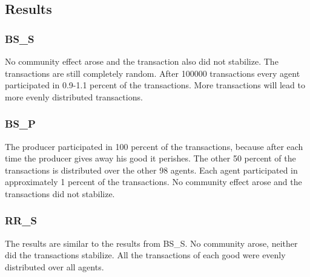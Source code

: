 \documentclass[twoside,openright]{uva-bachelor-thesis}
\begin{document}
\subsection{Results}

\subsubsection{BS\_S}
No community effect arose and the transaction also did not stabilize. The transactions are still completely random. After 100000 transactions every agent participated in 0.9-1.1 percent of the transactions. More transactions will lead to more evenly distributed transactions.

\subsubsection{BS\_P}
The producer participated in 100 percent of the transactions, because after each time the producer gives away his good it perishes. The other 50 percent of the transactions is distributed over the other 98 agents. Each agent participated in approximately 1 percent of the transactions. No community effect arose and the transactions did not stabilize.

\subsubsection{RR\_S}
The results are similar to the results from BS\_S. No community arose, neither did the transactions stabilize. All the transactions of each good were evenly distributed over all agents. 
\end{document}

